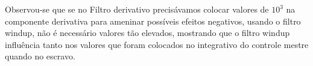 Observou-se que se no Filtro derivativo precisávamos colocar valores de $10^3$ na componente derivativa para ameninar possíveis efeitos
negativos, usando o filtro windup, não é necessário valores tão elevados, mostrando que o filtro windup influência tanto nos valores que
foram colocados no integrativo do controle mestre quando no escravo.